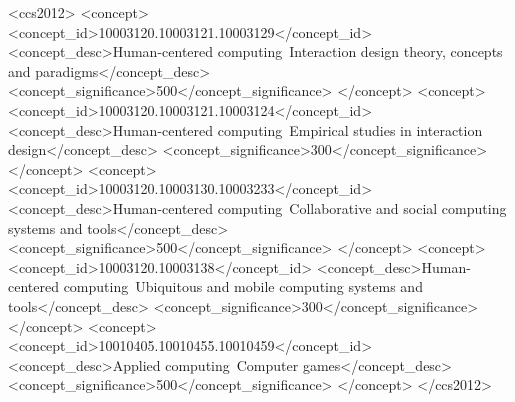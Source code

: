\documentclass[manuscript,review,anonymous]{acmart}
\begin{document}
\begin{CCSXML}
<ccs2012>
 <concept>
  <concept_id>10003120.10003121.10003129</concept_id>
  <concept_desc>Human-centered computing~Interaction design theory, concepts and paradigms</concept_desc>
  <concept_significance>500</concept_significance>
 </concept>
 <concept>
  <concept_id>10003120.10003121.10003124</concept_id>
  <concept_desc>Human-centered computing~Empirical studies in interaction design</concept_desc>
  <concept_significance>300</concept_significance>
 </concept>
 <concept>
  <concept_id>10003120.10003130.10003233</concept_id>
  <concept_desc>Human-centered computing~Collaborative and social computing systems and tools</concept_desc>
  <concept_significance>500</concept_significance>
 </concept>
 <concept>
  <concept_id>10003120.10003138</concept_id>
  <concept_desc>Human-centered computing~Ubiquitous and mobile computing systems and tools</concept_desc>
  <concept_significance>300</concept_significance>
 </concept>
 <concept>
  <concept_id>10010405.10010455.10010459</concept_id>
  <concept_desc>Applied computing~Computer games</concept_desc>
  <concept_significance>500</concept_significance>
 </concept>
</ccs2012>
\end{CCSXML}


\end{document}
